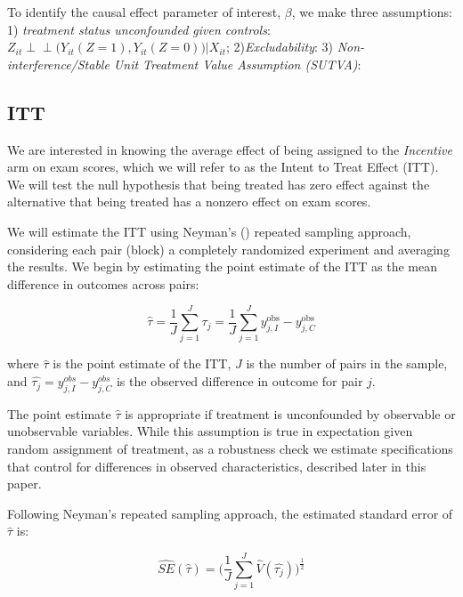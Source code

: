 \documentclass[12pt]{article}
\begin{document}
To identify the causal effect parameter of interest, $\beta$, we make three assumptions: 1) \textit{treatment status unconfounded given controls}: $Z_{it} \perp \!\!\! \perp \Big(Y_{it}(Z=1), Y_{it}(Z=0)\Big) \Big| X_{it}$; 2)\textit{Excludability}: 3) \textit{Non-interference/Stable Unit Treatment Value Assumption (SUTVA)}:



\subsection{ITT}

We are interested in knowing the average effect of being assigned to the \textit{Incentive} arm on exam scores, which we will refer to as the Intent to Treat Effect (ITT). We will test the null hypothesis that being treated has zero effect against the alternative that being treated has a nonzero effect on exam scores. %

We will estimate the ITT using Neyman's (\citeyear{neyman1923}) repeated sampling approach, considering each pair (block) a completely randomized experiment and averaging the results. We begin by estimating the point estimate of the ITT as the mean difference in outcomes across pairs:

\begin{equation} \label{itt_spec}
	\hat{\tau} = \frac{1}{J}\sum_{j=1}^{J} \hat{\tau_j} = \frac{1}{J}\sum_{j=1}^{J} y^\text{obs}_{j,I} - y^\text{obs}_{j,C}
\end{equation}

where $\hat{\tau}$ is the point estimate of the ITT, $J$ is the number of pairs in the sample, and $\hat{\tau_j} = y^{obs}_{j,I} - y^{obs}_{j,C}$ is the observed difference in outcome for pair $j$.

The point estimate $\hat{\tau}$ is appropriate if treatment is unconfounded by observable or unobservable variables. While this assumption is true in expectation given random assignment of treatment, as a robustness check we estimate specifications that control for differences in observed characteristics, described later in this paper.

Following Neyman's repeated sampling approach, the estimated standard error of $\hat{\tau}$ \citep{imai2008, ir2015, ai2017} is:

\begin{equation} \label{se_block}
	\hat{SE}(\hat{\tau}) = \Big(\frac{1}{J}\sum_{j=1}^{J} \hat{V}(\hat{\tau_j}) \Big)^\frac{1}{2}
\end{equation}
\end{document}
